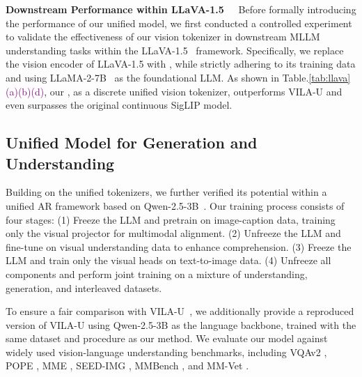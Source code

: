 

\textbf{Downstream Performance within LLaVA-1.5~~} Before formally introducing the performance of our unified model, we first conducted a controlled experiment to validate the effectiveness of our vision tokenizer in downstream MLLM understanding tasks within the LLaVA-1.5~\citep{liu2024llava1d5} framework. Specifically, we replace the vision encoder of LLaVA-1.5 with \ours{}, while strictly adhering to its training data and using LLaMA-2-7B~\citep{touvron2023llama} as the foundational LLM.
As shown in Table.\ref{tab:llava} \textcolor{purple}{(a)(b)(d)}, our \ours{}, as a discrete unified vision tokenizer, outperforms VILA-U and even surpasses the original continuous SigLIP model.


\subsection{Unified Model for Generation and Understanding}
\label{sec:exp_llm}

Building on the unified tokenizers, we further verified its potential within a unified AR framework based on Qwen-2.5-3B~\citep{yang2024qwen2d5}.
Our training process consists of four stages: (1) Freeze the LLM and pretrain on image-caption data, training only the visual projector for multimodal alignment. (2) Unfreeze the LLM and fine-tune on visual understanding data to enhance comprehension. (3) Freeze the LLM and train only the visual heads on text-to-image data. (4) Unfreeze all components and perform joint training on a mixture of understanding, generation, and interleaved datasets.

To ensure a fair comparison with VILA-U~\citep{wu2025vilau}, we additionally provide a reproduced version of VILA-U using Qwen-2.5-3B as the language backbone, trained with the same dataset and procedure as our method. %
We evaluate our model against widely used vision-language understanding benchmarks, including VQAv2 \citep{vqa_v2}, POPE \citep{POPE}, MME \citep{fu2024mme}, SEED-IMG \citep{li2023seedbench}, MMBench \citep{liu2023mmbench}, and MM-Vet \citep{yu2023mmvet}. 



